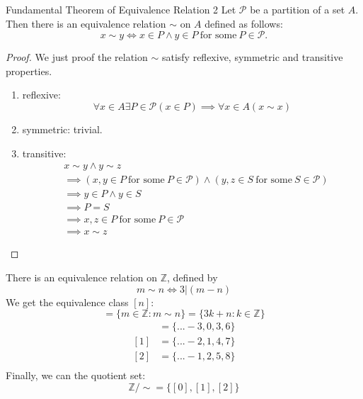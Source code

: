 \begin{theorem}{Fundamental Theorem of Equivalence Relation 2}{}
  Let $\mathcal{P}$ be a partition of a set $A$. Then there is an
  equivalence relation $\sim$ on $A$ defined as follows:
  \begin{equation*}
    x \sim y \iff x \in P \land y \in P \ \text{for some}\ P \in \mathcal{P}.
  \end{equation*}
\end{theorem}

\begin{proof}
  We just proof the relation $\sim$ satisfy reflexive, symmetric and
  transitive properties.
  \begin{enumerate}

    \item reflexive:
      \begin{equation*}
        \forall x \in A \exists P \in \mathcal{P} (x \in P) \implies
        \forall x \in A (x \sim x)
      \end{equation*}
    \item symmetric: trivial.
    \item transitive:
      \begin{align*}
        &x \sim y \land y \sim z\\
        &\implies (x,y \in P \ \text{for some}\ P \in
        \mathcal{P})\land (y,z \in S \ \text{for some}\ S \in \mathcal{P})\\
        &\implies y \in P \land y \in S\\
        &\implies P = S\\
        &\implies x,z \in P \ \text{for some}\ P \in \mathcal{P}\\
        &\implies x \sim z
      \end{align*}

  \end{enumerate}
\end{proof}

\begin{examples}
  There is an equivalence relation on $\mathbb{Z}$, defined by
  \begin{equation*}
    m \sim n \iff 3 | (m - n)
  \end{equation*}
  We get the equivalence class $[n]$:
  \begin{equation*}
    [n] = \{m \in \mathbb{Z}: m \sim n\} = \{3k+n: k \in \mathbb{Z}\}
  \end{equation*}
  \begin{align*}
    [0] &= \{...-3,0,3,6\}\\
    [1] &= \{...-2,1,4,7\}\\
    [2] &= \{...-1,2,5,8\}\\
  \end{align*}
  Finally, we can the quotient set:
  \begin{equation*}
    \mathbb{Z}/\sim = \{[0],[1],[2]\}
  \end{equation*}
\end{examples}

